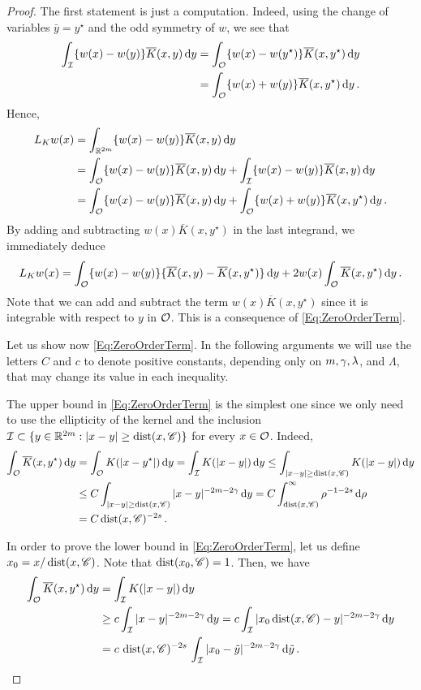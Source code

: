 \begin{proof}
	The first statement is just a computation. Indeed,  using the change of variables  $\bar{y} = y^\star$ and the odd symmetry of $w$, we see that
	\begin{align*}
	\int_{\mathcal{I}}  \{w(x) - w(y) \} \overline{K}(x, y)\,\mathrm{d} y &= \int_{\mathcal{O}} \{w(x) - w(y^\star) \}\overline{K}(x, y^\star)\,\mathrm{d} y \\
	&= \int_{\mathcal{O}} \{w(x) + w(y) \}\overline{K}(x, y^\star)\,\mathrm{d} y\,.
	\end{align*}
	Hence,
	\begin{align*}
	L_K w (x) &= \int_{\mathbb{R}^{2m}}  \{w(x) - w(y) \} \overline{K}(x, y)\,\mathrm{d} y \\
	&= \int_{\mathcal{O}}  \{w(x) - w(y) \} \overline{K}(x, y)\,\mathrm{d} y +\int_{\mathcal{I}}  \{w(x) - w(y) \} \overline{K}(x, y)\,\mathrm{d} y \\
	&= \int_{\mathcal{O}} \{w(x) - w(y) \} \overline{K}(x, y) \,\mathrm{d} y +  \int_{\mathcal{O}} \{w(x) + w(y) \} \overline{K}(x, y^\star) \,\mathrm{d} y \,.
	\end{align*}
	By adding and subtracting $w(x)\overline{K}(x, y^\star)$ in the last integrand, we immediately deduce
	$$
	L_K w (x) =  \int_{\mathcal{O}} \{w(x) - w(y) \} \{\overline{K}(x, y) - \overline{K}(x, y^\star)  \} \,\mathrm{d} y +  2 w(x) \int_{\mathcal{O}} \overline{K}(x, y^\star) \,\mathrm{d} y\,.
	$$
	Note that we can add and subtract the term $w(x)\overline{K}(x, y^\star)$  since it is integrable with respect to $y$ in $\mathcal{O}$. This is a consequence of \eqref{Eq:ZeroOrderTerm}.
	
	Let us show now \eqref{Eq:ZeroOrderTerm}. In the following arguments we will use the letters $C$ and $c$ to denote positive constants, depending only on $m, \gamma, \lambda$, and $\Lambda$, that may change its value in each inequality. 
	
	The upper bound in \eqref{Eq:ZeroOrderTerm} is the simplest one since we only need to use the ellipticity of the kernel and the inclusion $\mathcal{I} \subset \{y\in\mathbb{R}^{2m}:|x-y|\geq \operatorname{dist}(x,\mathscr{C})\}$ for every $x\in \mathcal{O}$. Indeed,
	\begin{align*}
	\int_{\mathcal{O}} \overline{K}(x, y^\star) \,\mathrm{d} y &=  \int_{\mathcal{O}} K(|x-y^\star|) \,\mathrm{d} y = \int_{\mathcal{I}} K(|x-y|) \,\mathrm{d} y \leq \int_{|x-y|\geq \operatorname{dist}(x,\mathscr{C})} K(|x-y|) \,\mathrm{d} y \\
	&\leq C \int_{|x-y|\geq \operatorname{dist}(x,\mathscr{C})} |x-y|^{-2m-2\gamma} \,\mathrm{d} y = C \int_{\operatorname{dist}(x,\mathscr{C})}^\infty \rho^{-1-2s} \,\mathrm{d} \rho \\
	&= C \operatorname{dist}(x,\mathscr{C})^{-2s}\,.
	\end{align*}

	In order to prove the lower bound in \eqref{Eq:ZeroOrderTerm}, let us define $x_0 = x/\operatorname{dist}(x,\mathscr{C})$. Note that $\operatorname{dist} (x_0, \mathscr{C}) = 1$. Then, we have
	\begin{align*}
	\int_{\mathcal{O}} \overline{K}(x, y^\star) \,\mathrm{d} y &=  \int_{\mathcal{I}} K(|x-y|) \,\mathrm{d} y \\
	&\geq c \int_{\mathcal{I}} |x-y|^{-2m-2\gamma} \,\mathrm{d} y = c \int_{\mathcal{I}} |x_0\operatorname{dist}(x,\mathscr{C})-y|^{-2m-2\gamma} \,\mathrm{d} y \\
	&= c \,\operatorname{dist}(x,\mathscr{C})^{-2s}\, \int_{\mathcal{I}} |x_0-\tilde{y}|^{-2m-2\gamma} \,\mathrm{d} \tilde{y}\,.
	\end{align*}
	

\end{proof}
